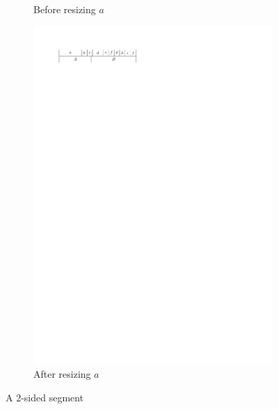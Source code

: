 \begin{figure}[b]
\begin{subfigure}[b]{0.45 \textwidth}
      \caption{Before resizing $a$}
      \label{fig:intro:2sidedBefore}
    \end{subfigure}
    \hfill
    \begin{subfigure}[b]{0.45 \textwidth}
      \centering
      \includegraphics[width=\textwidth]{introduction/img/2sidedAfter.pdf}
      \caption{After resizing $a$}
      \label{fig:intro:2sidedAfter}
    \end{subfigure}
    \caption{A 2-sided segment}
    \label{fig:intor:2sided}
    \quad


\end{figure}
